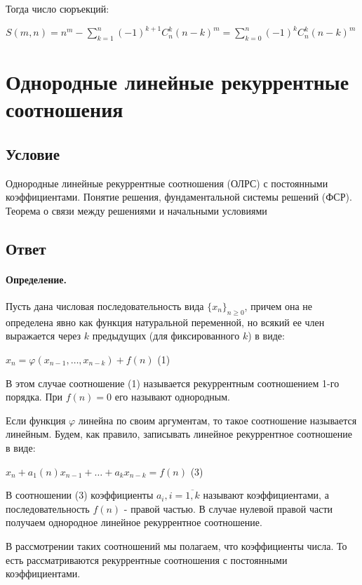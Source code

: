 \documentclass{report}
\begin{document}
Тогда число сюръекций:

$S(m,n) = n^{m} - \sum_{k=1}^{n}(-1)^{k+1}C_{n}^{k}(n-k)^{m} =
\sum_{k=0}^{n}(-1)^{k}C^{k}_{n}(n-k)^{m} $

\newpage

\section{Однородные линейные рекуррентные соотношения}
\subsection{Условие}
Однородные линейные рекуррентные соотношения (ОЛРС) с постоянными
коэффициентами. Понятие решения, фундаментальной системы решений (ФСР).
Теорема о связи между решениями и начальными условиями

\subsection{Ответ}

\paragraph*{Определение.}
Пусть дана числовая последовательность вида $\{x_{n}\}_{n\ge 0} $,
причем она не определена явно как функция натуральной переменной, но всякий
ее член выражается через $k$ предыдущих (для фиксированного $k$) в виде:

 $x_{n} = \varphi(x_{n-1},\ldots,x_{n-k}) + f(n)$ (1)

 В этом случае соотношение (1) называется рекуррентным соотношением 1-го порядка. При
 $f(n) = 0$ его называют однородным.

 Если функция  $\varphi$ линейна по своим аргументам, то такое соотношение называется
 линейным. Будем, как правило, записывать линейное рекуррентное соотношение в виде:

  $x_{n} +a_1(n)x_{n-1}+\ldots+a_{k}x_{n-k} = f(n)$ (3)

В соотношении (3) коэффициенты $a_{i}, i = \overline{1,k}$ называют коэффициентами,
а последовательность $f(n)$ - правой частью. В случае нулевой правой части получаем
однородное линейное рекуррентное соотношение.

В рассмотрении таких соотношений мы полагаем, что коэффициенты числа. То есть рассматриваются
рекуррентные соотношения с постоянными коэффициентами.

\medskip
\end{document}
